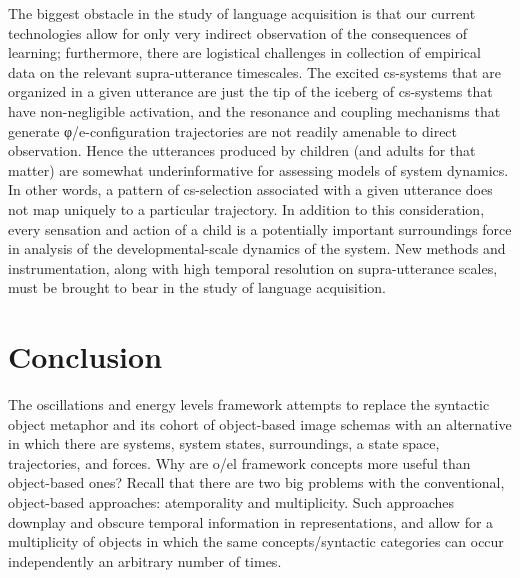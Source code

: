 The biggest obstacle in the study of language acquisition is that our current technologies allow for only very indirect observation of the consequences of learning; furthermore, there are logistical challenges in collection of empirical data on the relevant supra-utterance timescales. The excited cs-systems that are organized in a given utterance are just the tip of the iceberg of cs-systems that have non-negligible activation, and the resonance and coupling mechanisms that generate φ/e-configuration trajectories are not readily amenable to direct observation. Hence the utterances produced by children (and adults for that matter) are somewhat underinformative for assessing models of system dynamics. In other words, a pattern of cs-selection associated with a given utterance does not map uniquely to a particular trajectory. In addition to this consideration, every sensation and action of a child is a potentially important surroundings force in analysis of the developmental-scale dynamics of the system. New methods and instrumentation, along with high temporal resolution on supra-utterance scales, must be brought to bear in the study of language acquisition.

\section{Conclusion}

The oscillations and energy levels framework attempts to replace the syntactic object metaphor and its cohort of object-based image schemas with an alternative in which there are systems, system states, surroundings, a state space, trajectories, and forces. Why are o/el framework concepts more useful than object-based ones? Recall that there are two big problems with the conventional, object-based approaches: atemporality and multiplicity. Such approaches downplay and obscure temporal information in representations, and allow for a multiplicity of objects in which the same concepts/syntactic categories can occur independently an arbitrary number of times. 

